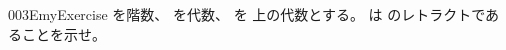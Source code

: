 \documentclass[index]{subfiles}
\begin{document}
\begin{myBlock}{003E}{myExercise}
  を階数、
  を\myInlineMath{\myNat}代数、
  を
  上の\myInlineMath{\myNat}代数とする。
  は
  のレトラクトであることを示せ。
\end{myBlock}
\end{document}
